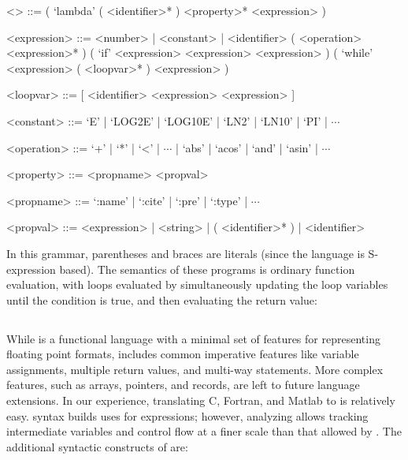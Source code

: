 \documentclass[main.tex]{subfiles}
\begin{document}
\begin{grammar}
<\core> ::= ( `lambda' ( <identifier>* ) <property>* <expression> )

<expression> ::= <number> | <constant> | <identifier>
\alt ( <operation> <expression>* )
\alt ( `if' <expression> <expression> <expression> )
\alt ( `while' <expression> ( <loopvar>* ) <expression> )

<loopvar> ::= [ <identifier> <expression> <expression> ]

<constant> ::= `E' | `LOG2E' | `LOG10E' | `LN2' | `LN10' | `PI' | $\dotsb$

<operation> ::= `+' | `*' | `<' | $\dotsb$ | `abs' | `acos' | `and' | `asin' | $\dotsb$

<property> ::= <propname> <propval>

<propname> ::= `:name' | `:cite' | `:pre' | `:type' | $\dotsb$

<propval> ::= <expression> | <string> | ( <identifier>* ) | <identifier>
\end{grammar}

In this grammar, parentheses and braces are literals
  (since the language is S-expression based).
The semantics of these programs is ordinary function evaluation,
  with  loops evaluated
  by simultaneously updating the loop variables
  until the condition is true,
  and then evaluating the return value:

\begin{mathpar}

\end{mathpar}

\subsection{\surface}

While \core is a functional language
  with a minimal set of features
  for representing floating point formats,
  \surface includes common imperative features
  like variable assignments,
  multiple return values,
  and multi-way  statements.
More complex features,
  such as arrays, pointers, and records,
  are left to future language extensions.
In our experience,
  translating C, Fortran, and Matlab to \surface is relatively easy.
\surface syntax builds uses \core for expressions;
  however, analyzing \surface allows tracking intermediate variables
  and control flow at a finer scale than that allowed by \core.
The additional syntactic constructs of \surface are:
\end{document}
